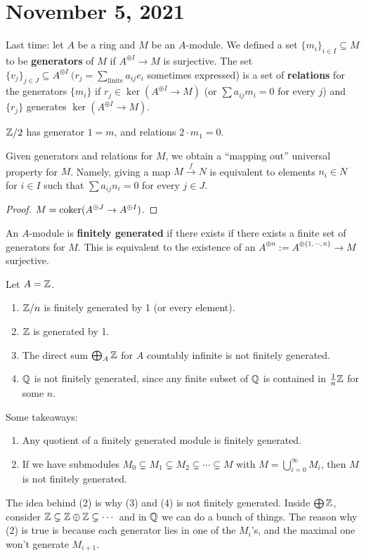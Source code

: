 \section{November 5, 2021} 
Last time: let $A$ be a ring and $M$ be an $A$-module. We defined a set $\{m _i  \} _{ i \in I}\subseteq M$ to be \textbf{generators} of $M$ if $A ^{\oplus I}\to  M$ is surjective. The set $\{v _j \}  _{ j \in J}\subseteq A ^{\oplus I} \ (r_j  = \sum _{\text{finite} }a _{ij}e_i $ sometimes expressed) is a set of \textbf{relations} for the generators $\{ m_i \} $ if $r_j  \in \ker (A^{\oplus I}\to M)$ (or $\sum a_{ij}m_i =0$ for every $j$) and $\{r_j \} $ generates $\ker (A^{\oplus I}\to M)$.

\begin{example}
    $\mathbb{Z} /2$ has generator $1 =m$, and relations $2\cdot m_1=0$.
\end{example}
\begin{remark}
    Given generators and relations for $M$, we obtain a ``mapping out'' universal property for $M$. Namely, giving a map $M \xrightarrow{f} N$ is equivalent to elements $n_i  \in N$ for $i \in I$ such that $\sum a _{ij}n _i =0$ for every $j \in J$.
\end{remark}
\begin{proof}
    $M= \operatorname{coker}(A ^{\oplus J}\to A ^{\oplus I})$.
\end{proof}
\begin{definition}
    An $A$-module is \textbf{finitely generated} if there exists if there exists a finite set of generators for $M$. This is equivalent to the existence of an $A ^{\oplus n}:= A ^{\oplus \{1, \cdots , n\} }\to  M$ surjective.
\end{definition}
\begin{example}
    Let $A=\mathbb{Z}$.
    \begin{enumerate}[label=(\arabic*)]
    \setlength\itemsep{-.2em}
\item $\mathbb{Z} /n$ is finitely generated by 1 (or every element).
\item $\mathbb{Z} $ is generated by 1.
\item The direct sum $\bigoplus_A \mathbb{Z}$ for $A$ countably infinite is not finitely generated.
\item $\mathbb{Q}$ is not finitely generated, since any finite subset of $\mathbb{Q}$ is contained in $ \frac{1}{n}\mathbb{Z}$ for some $n$.
    \end{enumerate}
\end{example}
Some takeaways:
    \begin{enumerate}[label=(\arabic*)]
    \setlength\itemsep{-.2em}
\item Any quotient of a finitely generated module is finitely generated.
\item If we have submodules $M_0 \subsetneq M_1 \subsetneq M_2 \subsetneq  \cdots  \subsetneq M $ with $M = \bigcup_{i=0} ^{\infty}M_i $, then $M$ is not finitely generated.
    \end{enumerate}
    The idea behind (2) is why (3) and (4) is not finitely generated. Inside $\bigoplus \mathbb{Z}$, consider $\mathbb{Z} \subsetneq \mathbb{Z} \oplus \mathbb{Z} \subsetneq \cdots $ and in $\mathbb{Q}$ we can do a bunch of things. The reason why (2) is true is because each generator lies in one of the $M_i $'s, and the maximal one won't generate $M_{i+1}$.


